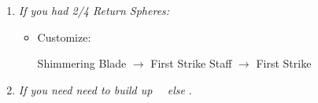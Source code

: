 \begin{multicols}{2}
\begin{enumerate}[resume]
  \item \textit{If you had 2/4 Return Spheres:}
        \begin{itemize}
          \item Customize:
                \begin{itemize}
                  \auronf Shimmering Blade $\rightarrow$ First Strike
                  \yunaf Staff $\rightarrow$ First Strike
                \end{itemize}
        \end{itemize}
        \item \formation{\tidus}{\rikku}{\auron} \textit{If you need need to build up \rikku\ \od\ else } \formation{\tidus}{\kimahri}{\wakka}.
\end{enumerate}


\end{multicols}
